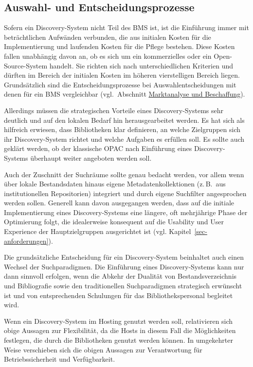 \documentclass[
  11pt,
  letterpaper,
  DIV=11,
  twoside]{scrreprt}
\begin{document}
\subsection{Auswahl- und
Entscheidungsprozesse}\label{auswahl--und-entscheidungsprozesse}

Sofern ein Discovery-System nicht Teil des BMS ist, ist die Einführung
immer mit beträchtlichen Aufwänden verbunden, die aus initialen Kosten
für die Implementierung und laufenden Kosten für die Pflege bestehen.
Diese Kosten fallen unabhängig davon an, ob es sich um ein kommerzielles
oder ein Open-Source-System handelt. Sie richten sich nach
unterschiedlichen Kriterien und dürften im Bereich der initialen Kosten
im höheren vierstelligen Bereich liegen. Grundsätzlich sind die
Entscheidungsprozesse bei Auswahlentscheidungen mit denen für ein BMS
vergleichbar (vgl.~Abschnitt
\hyperref[marktanalyse-und-beschaffung]{Marktanalyse und Beschaffung}).

Allerdings müssen die strategischen Vorteile eines Discovery-Systems
sehr deutlich und auf den lokalen Bedarf hin herausgearbeitet werden. Es
hat sich als hilfreich erwiesen, dass Bibliotheken klar definieren, an
welche Zielgruppen sich ihr Discovery-System richtet und welche Aufgaben
es erfüllen soll. Es sollte auch geklärt werden, ob der klassische OPAC
nach Einführung eines Discovery-Systems überhaupt weiter angeboten
werden soll.

Auch der Zuschnitt der Suchräume sollte genau bedacht werden, vor allem
wenn über lokale Bestandsdaten hinaus eigene Metadatenkollektionen
(z.\,B.~aus institutionellen Repositorien) integriert und durch eigene
Suchfilter angesprochen werden sollen. Generell kann davon ausgegangen
werden, dass auf die initiale Implementierung eines Discovery-Systems
eine längere, oft mehrjährige Phase der Optimierung folgt, die
idealerweise konsequent auf die Usability und User Experience der
Hauptzielgruppen ausgerichtet ist (vgl.
Kapitel~\ref{sec-anforderungen}).

Die grundsätzliche Entscheidung für ein Discovery-System beinhaltet auch
einen Wechsel der Suchparadigmen. Die Einführung eines Discovery-Systems
kann nur dann sinnvoll erfolgen, wenn die Abkehr der Dualität von
Bestandsverzeichnis und Bibliografie sowie den traditionellen
Suchparadigmen strategisch erwünscht ist und von entsprechenden
Schulungen für das Bibliothekspersonal begleitet wird.

Wenn ein Discovery-System im Hosting genutzt werden soll, relativieren
sich obige Aussagen zur Flexibilität, da die Hosts in diesem Fall die
Möglichkeiten festlegen, die durch die Bibliotheken genutzt werden
können. In umgekehrter Weise verschieben sich die obigen Aussagen zur
Verantwortung für Betriebssicherheit und Verfügbarkeit.
\end{document}
